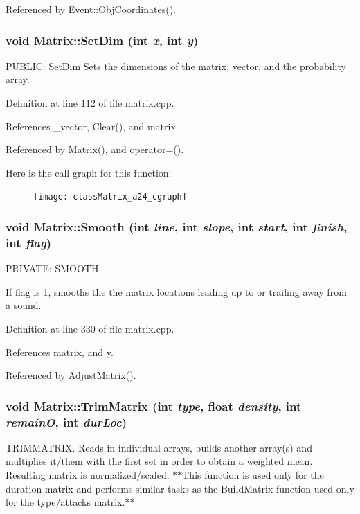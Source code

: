 Referenced by Event::Obj\-Coordinates().
\subsubsection{\setlength{\rightskip}{0pt plus 5cm}void Matrix::Set\-Dim (int {\em x}, int {\em y})}\label{classMatrix_a24}


PUBLIC: Set\-Dim Sets the dimensions of the matrix, vector, and the probability array. 

Definition at line 112 of file matrix.cpp.

References \_\-vector, Clear(), and matrix.

Referenced by Matrix(), and operator=().

Here is the call graph for this function:\begin{figure}[H]
\begin{center}
\leavevmode
\texttt{[image: classMatrix\_a24\_cgraph]}
\end{center}
\end{figure}
\subsubsection{\setlength{\rightskip}{0pt plus 5cm}void Matrix::Smooth (int {\em line}, int {\em slope}, int {\em start}, int {\em finish}, int {\em flag})\hspace{0.3cm}{\tt  [private]}}\label{classMatrix_d0}


PRIVATE: SMOOTH

If flag is 1, smooths the the matrix locations leading up to or trailing away from a sound. 

Definition at line 330 of file matrix.cpp.

References matrix, and y.

Referenced by Adjust\-Matrix().
\subsubsection{\setlength{\rightskip}{0pt plus 5cm}void Matrix::Trim\-Matrix (int {\em type}, float {\em density}, int {\em remain\-O}, int {\em dur\-Loc})}\label{classMatrix_a13}


TRIMMATRIX. Reads in individual arrays, builds another array(s) and multiplies it/them with the first set in order to obtain a weighted mean. Resulting matrix is normalized/scaled. $\ast$$\ast$This function is used only for the duration matrix and performs similar tasks as the Build\-Matrix function used only for the type/attacks matrix.$\ast$$\ast$ 

